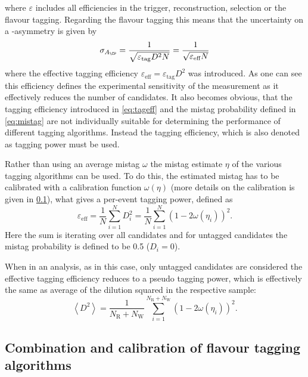 where $\varepsilon$ includes all efficiencies in the trigger, reconstruction, selection or the flavour tagging.
Regarding the flavour tagging this means that the uncertainty on a \CP-asymmetry is given by
\begin{equation}
\sigma_{A_{\CP}}=\frac{1}{\sqrt{\varepsilon_{\text{tag}}D^2N}}=\frac{1}{\sqrt{\varepsilon_{\text{eff}}N}}
\end{equation}
where the effective tagging efficiency $\varepsilon_{\text{eff}}=\varepsilon_{\text{tag}}D^2$ was introduced.
As one can see this efficiency defines the experimental sensitivity of the measurement as it effectively reduces the number of candidates.
It also becomes obvious, that the tagging efficiency introduced in \cref{eq:tageff} and the mistag probability defined in \cref{eq:mistag} are not individually suitable for determining the performance of different tagging algorithms.
Instead the tagging efficiency, which is also denoted as tagging power must be used.

Rather than using an average mistag $\omega$ the mistag estimate $\eta$ of the various tagging algorithms can be used.
To do this, the estimated mistag has to be calibrated with a calibration function $\omega(\eta)$ (more details on the calibration is given in \cref{sec:CombAndCalib}), what gives a per-event tagging power, defined as
\begin{equation}
\varepsilon_{\text{eff}}=\frac{1}{N}\sum_{i=1}^{N}D_i^2=\frac{1}{N}\sum_{i=1}^{N}\left(1-2\omega(\eta_i)\right)^2.
\end{equation}
Here the sum is iterating over all candidates and for untagged candidates the mistag probability is defined to be \num{0.5} ($D_i=0$).

When in an analysis, as in this case, only untagged candidates are considered the effective tagging efficiency reduces to a pseudo tagging power, which is effectively the same as average of the dilution squared in the respective sample:
\begin{equation}
\left<D^2\right>=\frac{1}{N_{\text{R}}+N_{\text{W}}}\sum_{i=1}^{N_{\text{R}}+N_{\text{W}}}\left(1-2\omega(\eta_i)\right)^2.
\end{equation}

\subsection{Combination and calibration of flavour tagging algorithms}
\label{sec:CombAndCalib}

